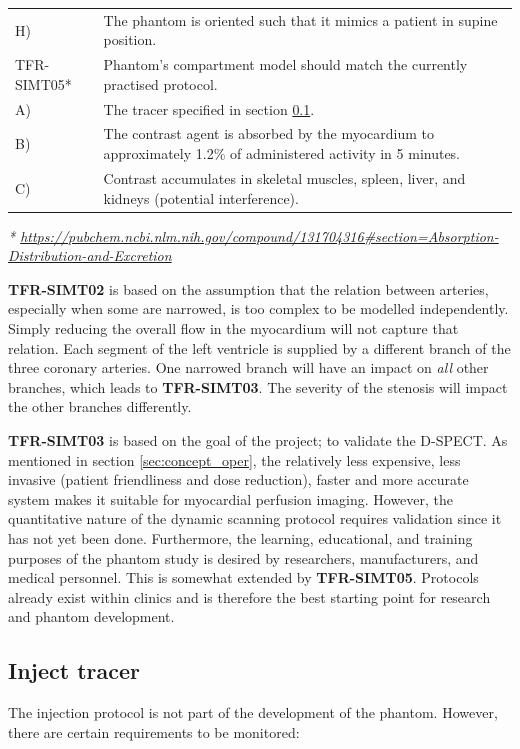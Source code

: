 \begin{table} [H]
\begin{tabular}{l|p{120mm}|}
	\hspace{1.5cm} H) & The phantom is oriented such that it mimics a patient in supine position. \\
	TFR-SIMT05* & Phantom's compartment model should match the currently practised protocol.\\
	\hspace{1.5cm} A) & The tracer specified in section \ref{sec:inj_tracer}.\\
	\hspace{1.5cm} B) & The contrast agent is absorbed by the myocardium to approximately 1.2\% of administered activity in 5 minutes. \\
	\hspace{1.5cm} C) & Contrast accumulates in skeletal muscles, spleen, liver, and kidneys (potential interference). \\
	\cline{2-2}
\end{tabular}
\raggedright
\textit{* \url{https://pubchem.ncbi.nlm.nih.gov/compound/131704316\#section=Absorption-Distribution-and-Excretion}}
\end{table}

\textbf{TFR-SIMT02} is based on the assumption that the relation between arteries, especially when some are narrowed, is too complex to be modelled independently. Simply reducing the overall flow in the myocardium will not capture that relation. Each segment of the left ventricle is supplied by a different branch of the three coronary arteries. One narrowed branch will have an impact on \textit{all} other branches, which leads to \textbf{TFR-SIMT03}. The severity of the stenosis will impact the other branches differently.

\textbf{TFR-SIMT03} is based on the goal of the project; to validate the D-SPECT. As mentioned in section \ref{sec:concept_oper}, the relatively less expensive, less invasive (patient friendliness and dose reduction), faster and more accurate system makes it suitable for myocardial perfusion imaging. However, the quantitative nature of the dynamic scanning protocol requires validation since it has not yet been done. Furthermore, the learning, educational, and training purposes of the phantom study is desired by researchers, manufacturers, and medical personnel. This is somewhat extended by \textbf{TFR-SIMT05}. Protocols already exist within clinics and is therefore the best starting point for research and phantom development.

\subsection{Inject tracer}
\label{sec:inj_tracer}
The injection protocol is not part of the development of the phantom. However, there are certain requirements to be monitored:

